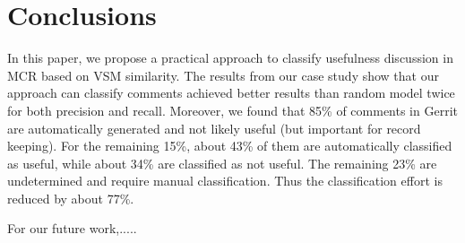 
\section{Conclusions}

In this paper, we propose a practical approach to classify usefulness discussion in MCR based on VSM similarity.
The results from our case study show that our approach can classify comments achieved better results than random model twice for both precision and recall.
Moreover, we found that 85\% of comments in Gerrit are automatically generated and not likely useful (but important for record keeping). For the remaining 15\%, about 43\% of them are automatically classified as useful, while about 34\% are classified as not useful. The remaining 23\% are undetermined and require manual classification. Thus the classification effort is reduced by about 77\%.

For our future work,.....

